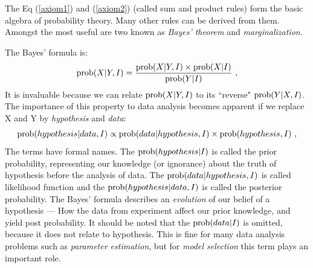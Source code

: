 \documentclass[11pt, a4paper]{article}
\begin{document}
The Eq (\ref{axiom1}) and (\ref{axiom2}) (called sum and product rules) form the basic algebra of probability theory. Many other rules can be derived from them. Amongst the most useful are two known as {\em Bayes' theorem} and {\em marginalization}. 

The Bayes' formula is:
\begin{equation}
{\rm prob}(X|Y,I)=\frac{{\rm prob}(X|Y,I)\times {\rm prob}(X|I)}{{\rm prob}(Y|I)}~,
\end{equation}
It is invaluable because we can relate ${\rm prob}(X|Y,I)$ to its ``reverse" ${\rm prob}(Y|X,I)$. The importance of this property to data analysis becomes apparent if we replace X and Y by {\em hypothesis} and {\em data}:
\begin{equation}
{\rm prob}(hypothesis|data,I)\propto {\rm prob}(data|hypothesis,I)\times {\rm prob}(hypothesis,I)~,
\end{equation}
The terms have formal names. The ${\rm prob}(hypothesis|I)$ is called the prior probability, representing our knowledge (or ignorance) about the truth of hypothesis before the analysis of data. The ${\rm prob}(data|hypothesis,I)$  is called likelihood function and the ${\rm prob}(hypothesis|data,I)$ is called the posterior probability. The Bayes' formula describes an {\em evolution} of our belief of a hypothesis --- How the data from experiment affect our prior knowledge, and yield post probability. It should be noted that  the ${\rm prob}(data|I)$ is omitted, because it does not relate to hypothesis. This is fine for many data analysis problems such as {\em parameter estimation}, but for {\em model selection} this term plays an important role.
\end{document}

